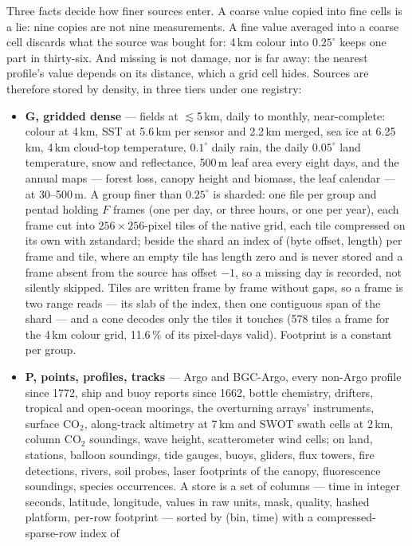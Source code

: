 \documentclass[10pt]{article}
\begin{document}
Three facts decide how finer sources enter. A coarse value copied into fine
cells is a lie: nine copies are not nine measurements. A fine value averaged
into a coarse cell discards what the source was bought for: 4\,km colour
into $0.25^\circ$ keeps one part in thirty-six. And missing is not damage,
nor is far away: the nearest profile's value depends on its distance, which
a grid cell hides. Sources are therefore stored by density, in three tiers
under one registry:
\begin{itemize}
\item \textbf{G, gridded dense} --- fields at ${\lesssim}$5\,km, daily to
monthly, near-complete: colour at 4\,km, SST at 5.6\,km per sensor and
2.2\,km merged, sea ice at 6.25\,km, 4\,km cloud-top temperature,
$0.1^\circ$ daily rain, the daily $0.05^\circ$ land temperature, snow and
reflectance, 500\,m leaf area every eight days, and the annual maps ---
forest loss, canopy height and biomass, the leaf calendar --- at 30--500\,m.
A group finer than $0.25^\circ$ is sharded: one file per group and
pentad holding $F$ frames (one per day, or three hours, or one per year), each
frame cut into $256\times256$-pixel tiles of the native grid, each tile
compressed on its own with zstandard; beside the shard an index of (byte
offset, length) per frame and tile, where an empty tile has length zero and is
never stored and a frame absent from the source has offset $-1$, so a missing
day is recorded, not silently skipped. Tiles are written frame by frame
without gaps, so a frame is two range reads --- its slab of the index, then
one contiguous span of the shard --- and a cone decodes only the tiles it
touches (578 tiles a frame for the 4\,km colour grid, 11.6\,\% of its
pixel-days valid). Footprint is a constant per group.
\item \textbf{P, points, profiles, tracks} --- Argo and BGC-Argo, every
non-Argo profile since 1772, ship and buoy reports since 1662, bottle
chemistry, drifters, tropical and open-ocean moorings, the overturning
arrays' instruments, surface CO$_2$, along-track altimetry at 7\,km and SWOT
swath cells at 2\,km, column CO$_2$ soundings, wave height, scatterometer
wind cells; on land, stations, balloon soundings, tide gauges, buoys,
gliders, flux towers, fire detections, rivers, soil probes, laser
footprints of the canopy, fluorescence soundings, species occurrences. A
store is a set of columns --- time in integer seconds, latitude,
longitude, values in raw units, mask, quality, hashed platform, per-row
footprint --- sorted by (bin, time) with a compressed-sparse-row index of

\end{itemize}
\end{document}
